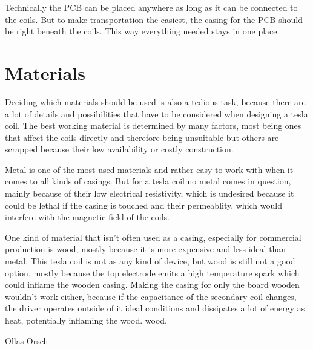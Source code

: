 Technically the PCB can be placed anywhere as long as it can be connected to the coils. But to make transportation the easiest, the casing for the PCB should be right beneath the coils. This way everything needed stays in one place. 

\section{Materials}

Deciding which materials should be used is also a tedious task, because there are a lot of details and possibilities that have to be considered when designing a tesla coil. The best working material is determined by many factors, most being ones that affect the coils directly and therefore being unsuitable but others are scrapped because their low availability or costly construction.

Metal is one of the most used materials and rather easy to work with when it comes to all kinds of casings. But for a tesla coil no metal comes in question, mainly because of their low electrical resistivity, which is undesired because it could be lethal if the casing is touched and their permeablity, which would interfere with the magnetic field of the coils. 

One kind of material that isn't often used as a casing, especially for commercial production is wood, mostly because it is more expensive and less ideal than metal. This tesla coil is not as any kind of device, but wood is still not a good option, mostly because the top electrode emits a high temperature spark which could inflame the wooden casing. Making the casing for only the board wooden wouldn't work either, because if the capacitance of the secondary coil changes, the driver operates outside of it ideal conditions and dissipates a lot of energy as heat, potentially inflaming the wood. wood.

Ollas Orsch


